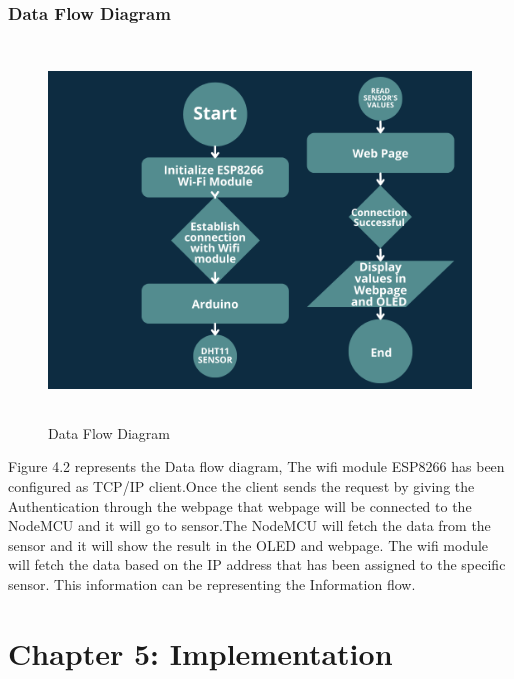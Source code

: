 \documentclass[12pt,a4paper,twocolumn,fleqn]{article}
\begin{document}
\subsubsection{Data Flow Diagram}
\begin{figure} [H]
\includegraphics[width=18cm,height=10cm]{media/Data Flow.png}
\centering
\caption{Data Flow Diagram}
\end{figure}
Figure 4.2 represents the Data flow diagram, The wifi module ESP8266 has been configured as TCP/IP client.Once the client sends the request by giving the Authentication through the webpage that webpage will be connected to the NodeMCU and it will go to sensor.The NodeMCU will fetch the data from the sensor and it will show the result in the OLED and webpage. The wifi module will fetch the data based on the IP address that has been assigned to the specific sensor. This information can be representing the Information flow.
\newpage
  \pagestyle{fancy}
  \fancyhf{}
  \chead{}
\renewcommand{\footrulewidth}{0.4pt}%
\normalsize
\newpage
  \pagestyle{fancy}
  \thispagestyle{empty}
  \thispagestyle{plain}
  \fancyhf{}
  \chead{}
\renewcommand{\footrulewidth}{0.4pt}%
\normalsize
\section{Chapter 5: Implementation} 
\end{document}
